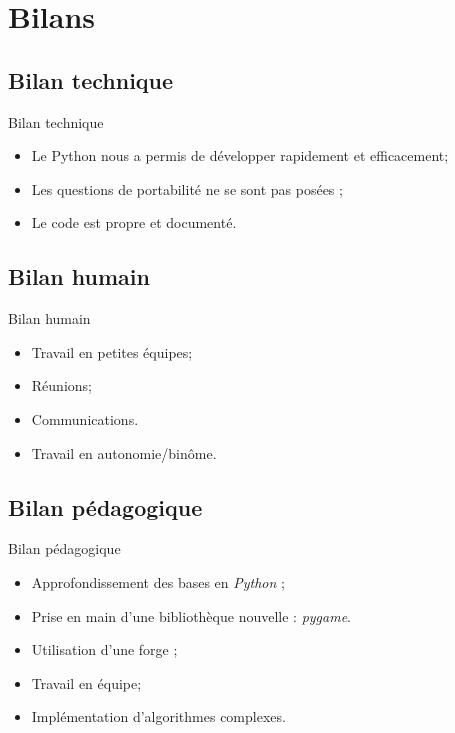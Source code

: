 \documentclass{beamer}
\begin{document}
\section{Bilans}
\subsection{Bilan technique}
	\begin{frame}{Bilan technique}
		\begin{itemize}
		\setlength{\itemsep}{0.3cm}
			\item Le Python nous a permis de développer rapidement et efficacement;
			\item Les questions de portabilité ne se sont pas posées ;
			\item Le code est propre et documenté.
		\end{itemize}
	\end{frame}
\subsection{Bilan humain}
	\begin{frame}{Bilan humain}
		\begin{itemize}
			\item Travail en petites équipes;
			\item Réunions;
			\item Communications.
			\vspace{1cm}
			\item Travail en autonomie/binôme.
		\end{itemize}
	\end{frame}
\subsection{Bilan pédagogique}
	\begin{frame}{Bilan pédagogique}
		\begin{itemize}
		\setlength{\itemsep}{0.3cm}
			\item Approfondissement des bases en \emph{Python} ;
			\item Prise en main d'une bibliothèque nouvelle :
				\emph{pygame}.
				
			\vspace{1cm}
			\item Utilisation d'une forge ;
			\item Travail en équipe;
            \item Implémentation d'algorithmes complexes.
		\end{itemize}
	\end{frame}
\end{document}
